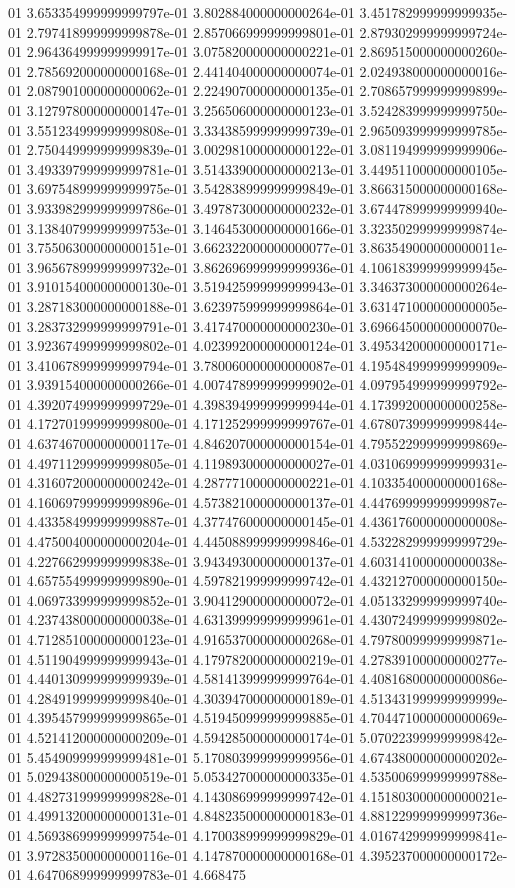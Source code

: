 01	3.653354999999999797e-01	3.802884000000000264e-01	3.451782999999999935e-01	2.797418999999999878e-01	2.857066999999999801e-01	2.879302999999999724e-01	2.964364999999999917e-01	3.075820000000000221e-01	2.869515000000000260e-01	2.785692000000000168e-01	2.441404000000000074e-01	2.024938000000000016e-01	2.087901000000000062e-01	2.224907000000000135e-01	2.708657999999999899e-01	3.127978000000000147e-01	3.256506000000000123e-01	3.524283999999999750e-01	3.551234999999999808e-01	3.334385999999999739e-01	2.965093999999999785e-01	2.750449999999999839e-01	3.002981000000000122e-01	3.081194999999999906e-01	3.493397999999999781e-01	3.514339000000000213e-01	3.449511000000000105e-01	3.697548999999999975e-01	3.542838999999999849e-01	3.866315000000000168e-01	3.933982999999999786e-01	3.497873000000000232e-01	3.674478999999999940e-01	3.138407999999999753e-01	3.146453000000000166e-01	3.323502999999999874e-01	3.755063000000000151e-01	3.662322000000000077e-01	3.863549000000000011e-01	3.965678999999999732e-01	3.862696999999999936e-01	4.106183999999999945e-01	3.910154000000000130e-01	3.519425999999999943e-01	3.346373000000000264e-01	3.287183000000000188e-01	3.623975999999999864e-01	3.631471000000000005e-01	3.283732999999999791e-01	3.417470000000000230e-01	3.696645000000000070e-01	3.923674999999999802e-01	4.023992000000000124e-01	3.495342000000000171e-01	3.410678999999999794e-01	3.780060000000000087e-01	4.195484999999999909e-01	3.939154000000000266e-01	4.007478999999999902e-01	4.097954999999999792e-01	4.392074999999999729e-01	4.398394999999999944e-01	4.173992000000000258e-01	4.172701999999999800e-01	4.171252999999999767e-01	4.678073999999999844e-01	4.637467000000000117e-01	4.846207000000000154e-01	4.795522999999999869e-01	4.497112999999999805e-01	4.119893000000000027e-01	4.031069999999999931e-01	4.316072000000000242e-01	4.287771000000000221e-01	4.103354000000000168e-01	4.160697999999999896e-01	4.573821000000000137e-01	4.447699999999999987e-01	4.433584999999999887e-01	4.377476000000000145e-01	4.436176000000000008e-01	4.475004000000000204e-01	4.445088999999999846e-01	4.532282999999999729e-01	4.227662999999999838e-01	3.943493000000000137e-01	4.603141000000000038e-01	4.657554999999999890e-01	4.597821999999999742e-01	4.432127000000000150e-01	4.069733999999999852e-01	3.904129000000000072e-01	4.051332999999999740e-01	4.237438000000000038e-01	4.631399999999999961e-01	4.430724999999999802e-01	4.712851000000000123e-01	4.916537000000000268e-01	4.797800999999999871e-01	4.511904999999999943e-01	4.179782000000000219e-01	4.278391000000000277e-01	4.440130999999999939e-01	4.581413999999999764e-01	4.408168000000000086e-01	4.284919999999999840e-01	4.303947000000000189e-01	4.513431999999999999e-01	4.395457999999999865e-01	4.519450999999999885e-01	4.704471000000000069e-01	4.521412000000000209e-01	4.594285000000000174e-01	5.070223999999999842e-01	5.454909999999999481e-01	5.170803999999999956e-01	4.674380000000000202e-01	5.029438000000000519e-01	5.053427000000000335e-01	4.535006999999999788e-01	4.482731999999999828e-01	4.143086999999999742e-01	4.151803000000000021e-01	4.499132000000000131e-01	4.848235000000000183e-01	4.881229999999999736e-01	4.569386999999999754e-01	4.170038999999999829e-01	4.016742999999999841e-01	3.972835000000000116e-01	4.147870000000000168e-01	4.395237000000000172e-01	4.647068999999999783e-01	4.668475